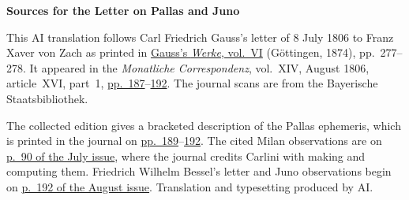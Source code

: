 \clearpage\thispagestyle{empty}
\begin{center}\textbf{Sources for the Letter on Pallas and Juno}\end{center}
\noindent This AI translation follows Carl Friedrich Gauss’s letter of 8 July 1806 to Franz Xaver von Zach as printed in \href{https://gdz.sub.uni-goettingen.de/id/PPN236007467}{Gauss’s \textit{Werke}, vol.~VI} (Göttingen, 1874), pp.~277--278. It appeared in the \textit{Monatliche Correspondenz}, vol.~XIV, August 1806, article~XVI, part~1, \href{https://www.digitale-sammlungen.de/en/view/bsb10538606?page=201}{pp.~187}--\href{https://www.digitale-sammlungen.de/en/view/bsb10538606?page=206}{192}. The journal scans are from the Bayerische Staatsbibliothek.
\par\medskip
The collected edition gives a bracketed description of the Pallas ephemeris, which is printed in the journal on \href{https://www.digitale-sammlungen.de/en/view/bsb10538606?page=203}{pp.~189}--\href{https://www.digitale-sammlungen.de/en/view/bsb10538606?page=206}{192}. The cited Milan observations are on \href{https://www.digitale-sammlungen.de/en/view/bsb10538606?page=100}{p.~90 of the July issue}, where the journal credits Carlini with making and computing them. Friedrich Wilhelm Bessel’s letter and Juno observations begin on \href{https://www.digitale-sammlungen.de/en/view/bsb10538606?page=206}{p.~192 of the August issue}. Translation and typesetting produced by AI.
\clearpage
